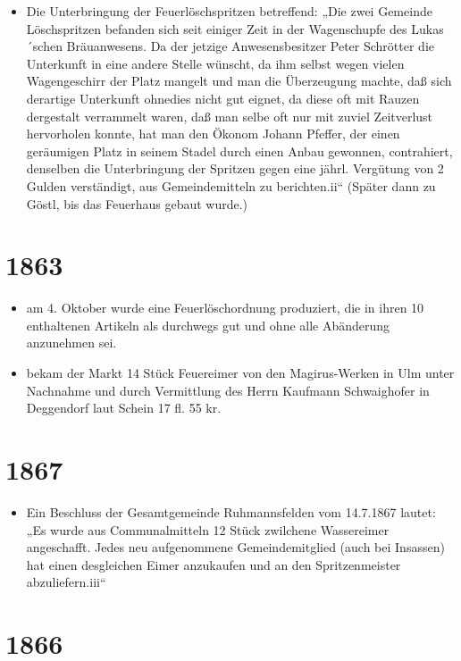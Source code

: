 \documentclass[12pt,a4paper]{book}
\begin{document}
\begin{itemize}
\item Die Unterbringung der Feuerlöschspritzen betreffend: „Die zwei Gemeinde
Löschspritzen befanden sich seit einiger Zeit in der Wagenschupfe des
Lukas´schen Bräuanwesens. Da der jetzige Anwesensbesitzer Peter Schrötter die
Unterkunft in eine andere Stelle wünscht, da ihm selbst wegen vielen
Wagengeschirr der Platz mangelt und man die Überzeugung machte, daß sich
derartige Unterkunft ohnedies nicht gut eignet, da diese oft mit Rauzen
dergestalt verrammelt waren, daß man selbe oft nur mit zuviel Zeitverlust
hervorholen konnte, hat man den Ökonom Johann Pfeffer, der einen geräumigen
Platz in seinem Stadel durch einen Anbau gewonnen, contrahiert, denselben die
Unterbringung der Spritzen gegen eine jährl. Vergütung von 2 Gulden verständigt,
aus Gemeindemitteln zu berichten.ii“ (Später dann zu Göstl, bis das Feuerhaus
gebaut wurde.)
\end{itemize}

\section*{1863}

\begin{itemize}
\item am 4. Oktober wurde eine Feuerlöschordnung produziert, die in ihren 10
enthaltenen Artikeln als durchwegs gut und ohne alle Abänderung anzunehmen sei.

\item bekam der Markt 14 Stück Feuereimer von den Magirus-Werken in Ulm unter
Nachnahme und durch Vermittlung des Herrn Kaufmann Schwaighofer in Deggendorf
laut Schein 17 fl. 55 kr.
\end{itemize}

\section*{1867}

\begin{itemize}
\item Ein Beschluss der Gesamtgemeinde Ruhmannsfelden vom 14.7.1867 lautet: „Es
wurde aus Communalmitteln 12 Stück zwilchene Wassereimer angeschafft. Jedes neu
aufgenommene Gemeindemitglied (auch bei Insassen) hat einen desgleichen Eimer
anzukaufen und an den Spritzenmeister abzuliefern.iii“
\end{itemize}

\section*{1866}
\end{document}
